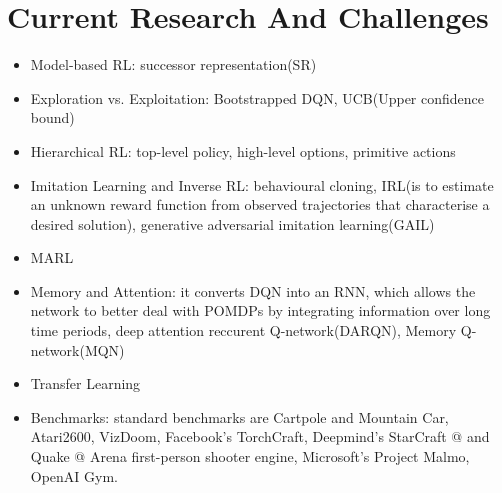 \documentclass{article}
\makeatletter
\newcommand*{\rom}[1]{\expandafter\@slowromancap\romannumeral #1@}
\makeatother
\begin{document}
\section{Current Research And Challenges}
\begin{itemize}
    \item Model-based RL: successor representation(SR)
    \item Exploration vs. Exploitation: Bootstrapped DQN, UCB(Upper confidence bound)
    \item Hierarchical RL: top-level policy, high-level options, primitive actions
    \item Imitation Learning and Inverse RL: behavioural cloning, IRL(is to estimate an unknown reward function from observed trajectories that characterise a desired solution), generative adversarial imitation learning(GAIL)
    \item MARL
    \item Memory and Attention: it converts DQN into an RNN, which allows the network to better deal with POMDPs by integrating information over long time periods, deep attention reccurent Q-network(DARQN), Memory Q-network(MQN)
    \item Transfer Learning
    \item Benchmarks: standard benchmarks are Cartpole and Mountain Car, Atari2600, VizDoom, Facebook's TorchCraft, Deepmind's StarCraft \rom{2} and Quake \rom{3} Arena first-person shooter engine, Microsoft's Project Malmo, OpenAI Gym.
\end{itemize}
\end{document}
